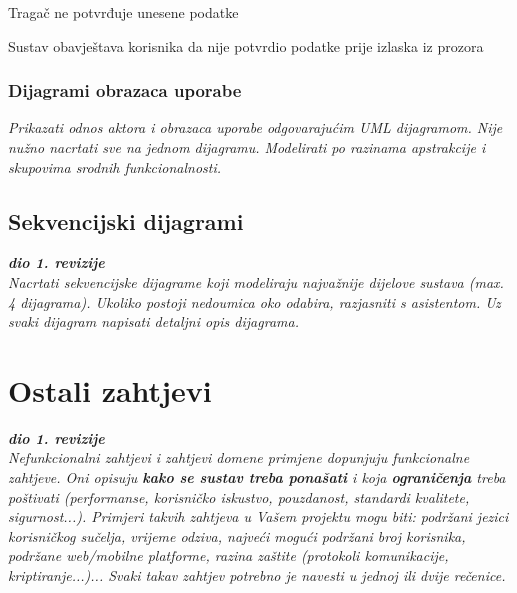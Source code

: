\begin{packed_item}
\begin{packed_item}
\begin{packed_enum}
							\end{packed_enum}
							
							\item[3.a] Tragač ne potvrđuje unesene podatke
							\item[] \begin{packed_enum}
								
								\item Sustav obavještava korisnika da nije potvrdio podatke prije izlaska iz prozora
								
							\end{packed_enum}
							
						\end{packed_item}
						
					\end{packed_item}
					
					
					
				
					
				\subsubsection{Dijagrami obrazaca uporabe}
					
					\textit{Prikazati odnos aktora i obrazaca uporabe odgovarajućim UML dijagramom. Nije nužno nacrtati sve na jednom dijagramu. Modelirati po razinama apstrakcije i skupovima srodnih funkcionalnosti.}
				\eject		
				
			\subsection{Sekvencijski dijagrami}
				
				\textbf{\textit{dio 1. revizije}}\\
				
				\textit{Nacrtati sekvencijske dijagrame koji modeliraju najvažnije dijelove sustava (max. 4 dijagrama). Ukoliko postoji nedoumica oko odabira, razjasniti s asistentom. Uz svaki dijagram napisati detaljni opis dijagrama.}
				\eject
	
		\section{Ostali zahtjevi}
		
			\textbf{\textit{dio 1. revizije}}\\
		 
			 \textit{Nefunkcionalni zahtjevi i zahtjevi domene primjene dopunjuju funkcionalne zahtjeve. Oni opisuju \textbf{kako se sustav treba ponašati} i koja \textbf{ograničenja} treba poštivati (performanse, korisničko iskustvo, pouzdanost, standardi kvalitete, sigurnost...). Primjeri takvih zahtjeva u Vašem projektu mogu biti: podržani jezici korisničkog sučelja, vrijeme odziva, najveći mogući podržani broj korisnika, podržane web/mobilne platforme, razina zaštite (protokoli komunikacije, kriptiranje...)... Svaki takav zahtjev potrebno je navesti u jednoj ili dvije rečenice.}
			 
			 
			 
	